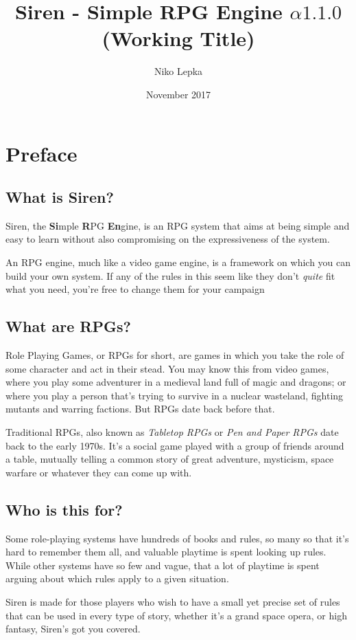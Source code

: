 \documentclass[a4paper]{book}
\title{Siren - Simple RPG Engine $\alpha1.1.0$\\(Working Title)}
\author{Niko Lepka}
\date{November 2017}
\begin{document}
\maketitle

\chapter*{Preface}
\section*{What is Siren?}
Siren, the \textbf{Si}mple \textbf{R}PG \textbf{En}gine, is an RPG system that aims at being simple and easy to learn without also compromising on the expressiveness of the system.

An RPG engine, much like a video game engine, is a framework on which you can build your own system. If any of the rules in this seem like they don't \textit{quite} fit what you need, you're free to change them for your campaign

\section*{What are RPGs?}
Role Playing Games, or RPGs for short, are games in which you take the role of some character and act in their stead.
You may know this from video games, where you play some adventurer in a medieval land full of magic and dragons; or where you play a person that's trying to survive in a nuclear wasteland, fighting mutants and warring factions.
But RPGs date back before that.

Traditional RPGs, also known as \textit{Tabletop RPGs} or \textit{Pen and Paper RPGs} date back to the early 1970s.
It's a social game played with a group of friends around a table, mutually telling a common story of great adventure, mysticism, space warfare or whatever they can come up with.

\section*{Who is this for?}
Some role-playing systems have hundreds of books and rules, so many so that it's hard to remember them all, and valuable playtime is spent looking up rules. 
While other systems have so few and vague, that a lot of playtime is spent arguing about which rules apply to a given situation.

Siren is made for those players who wish to have a small yet precise set of rules that can be used in every type of story, whether it's a grand space opera, or high fantasy, Siren's got you covered.
\end{document}
